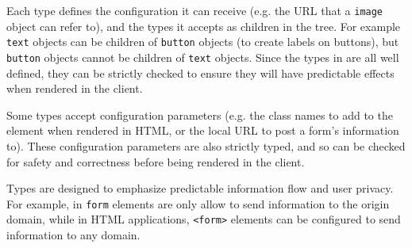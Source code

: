 Each type defines the configuration it can receive (e.g. the
URL that a \texttt{image} object can refer to), and the types it
accepts as children in the tree.  For example \texttt{text} objects can be
children of \texttt{button} objects (to create labels on buttons), but
\texttt{button} objects cannot be children of \texttt{text} objects.
Since the types in \CDF are all well defined, they can be strictly checked to
ensure they will have predictable effects when rendered in the client.

Some types accept configuration parameters (e.g. the class names to add to the
element when rendered in HTML, or the local URL to post a form's information
to).  These configuration parameters are also strictly typed, and so can be
checked for safety and correctness before being rendered in the client.

Types are designed to emphasize predictable information flow and user privacy.
For example, in \CDF \texttt{form} elements are only allow to send information to
the origin domain, while in HTML applications, \texttt{<form>} elements
can be configured to send information to any domain.




